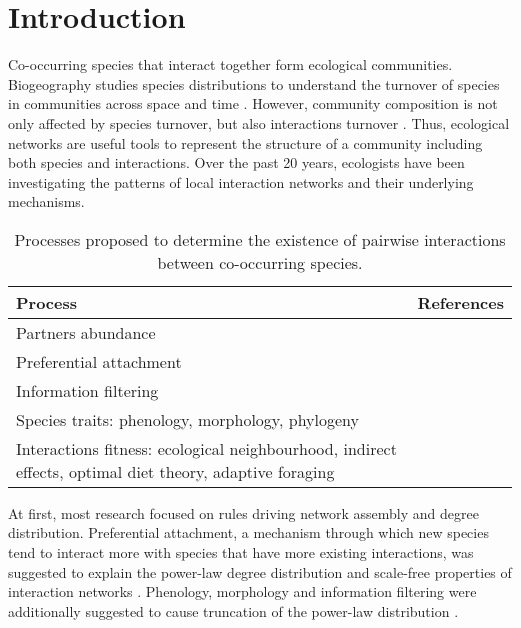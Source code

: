 \documentclass[12pt]{article}
\begin{document}
\maketitle

\section{Introduction}
Co-occurring species that interact together form ecological communities.
Biogeography studies species distributions to understand the turnover of species in communities across space and time \citep{Gaston2003}.
However, community composition is not only affected by species turnover, but also interactions turnover \citep{Gravel2019,Graham2018}.
Thus, ecological networks are useful tools to represent the structure of a community including both species and interactions.
Over the past 20 years, ecologists have been investigating the patterns of local interaction networks and their underlying mechanisms.

\begin{table}[tb]
    \begin{small}
    \centering
    \begin{tabular}{p{}|p{}}
        Process & References \\ \hline
        Partners abundance & \citet{Olesen2008,Garcia2014,Donoso2017,Coux2021}\\
        Preferential attachment & \citet{Amaral2000,Jordano2003,Olesen2008,Tylianakis2018,BramonMora2020}\\
        Information filtering & \citet{Mossa2002}\\
        Species traits: phenology, morphology, phylogeny & \citet{Burkle2013,Rohr2014,Jordano2016,Rominger2016,Hutchinson2017,Pires2020,Coux2021}\\
        Interactions fitness: ecological neighbourhood, indirect effects, optimal diet theory, adaptive foraging & \citet{Pires2011,Aizen2012,Valdovinos2013,Donoso2017,Guimaraes2017,Levine2017}\\
    \end{tabular}
    \caption{Processes proposed to determine the existence of pairwise interactions between co-occurring species.}
    \label{tab:processes}
    \end{small}
\end{table}

At first, most research focused on rules driving network assembly and degree distribution.
Preferential attachment, a mechanism through which new species tend to interact more with species that have more existing interactions, was suggested to explain the power-law degree distribution and scale-free properties of interaction networks \citep{Watts1998,Amaral2000,Jordano2003,Tylianakis2018}.
Phenology, morphology and information filtering were additionally suggested to cause truncation of the power-law distribution \citep{Mossa2002,Olesen2008}.
\end{document}
